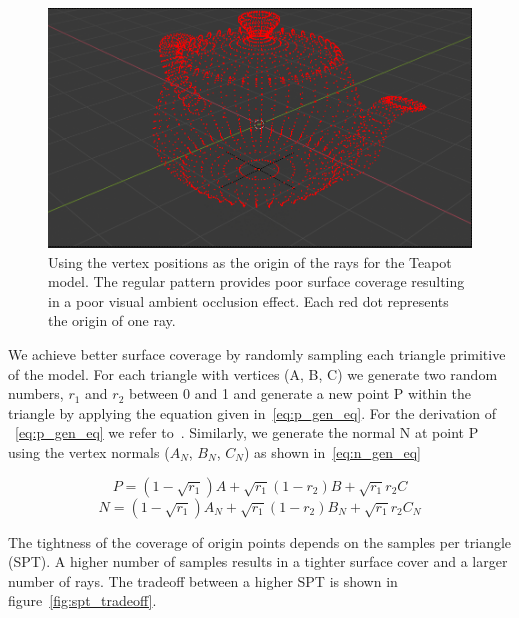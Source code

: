 \begin{figure}[htb]
  \centering
  \includegraphics[width=0.8\linewidth]{ao_folder/figures/teapot_vertices.png}
 
  \caption{\label{fig:teapot_vertices}Using the vertex positions as the origin of the rays for the Teapot model. The regular pattern provides poor surface coverage resulting in a poor visual ambient occlusion effect. Each red dot represents the origin of one ray.}
\end{figure}

We achieve better surface coverage by randomly sampling each triangle primitive of the model.
For each triangle with vertices (A, B, C) we generate two random numbers, $r_{1}$ and $r_{2}$ between 0 and 1 and generate a new point P within the triangle by applying the equation given in~\autoref{eq:p_gen_eq}. For the derivation of ~\autoref{eq:p_gen_eq} we refer to~\cite{10.1145/571647.571648}.
Similarly, we generate the normal N at point P using the vertex normals ($A_{N}$, $B_{N}$, $C_{N}$) as shown in~\autoref{eq:n_gen_eq}

\begin{equation}
\label{eq:p_gen_eq}
  P = (1 - \sqrt{r_{1}})A + \sqrt{r_{1}}(1-r_{2})B + \sqrt{r_{1}}r_{2}C
\end{equation}
\begin{equation}
\label{eq:n_gen_eq}
  N = (1 - \sqrt{r_{1}})A_{N} + \sqrt{r_{1}}(1-r_{2})B_{N} + \sqrt{r_{1}}r_{2}C_{N}
\end{equation}

The tightness of the coverage of origin points depends on the samples per triangle (SPT). A higher number of samples results in a tighter surface cover and a larger number of rays. The tradeoff between a higher SPT is shown in figure~\autoref{fig:spt_tradeoff}.

